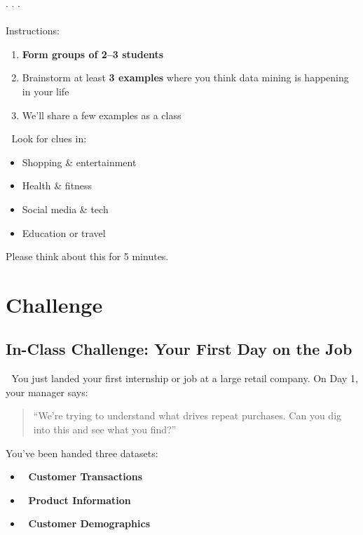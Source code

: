 \documentclass[
  letterpaper,
  DIV=11,
  numbers=noendperiod]{scrartcl}
\makeatletter
\let\oldparagraph\paragraph
\renewcommand{\paragraph}{
    \@ifstar
      \xxxParagraphStar
      \xxxParagraphNoStar
  }
\newcommand{\xxxParagraphStar}[1]{\oldparagraph*{#1}\mbox{}}
\newcommand{\xxxParagraphNoStar}[1]{\oldparagraph{#1}\mbox{}}
\providecommand{\tightlist}{%
  \setlength{\itemsep}{0pt}\setlength{\parskip}{0pt}}
\makeatother
\begin{document}
. . .

\paragraph{Instructions:}\label{instructions}

\begin{enumerate}
\def\labelenumi{\arabic{enumi}.}
\tightlist
\item
  \textbf{Form groups of 2--3 students}
\item
  Brainstorm at least \textbf{3 examples} where you think data mining is
  happening in your life
\item
  We'll share a few examples as a class
\end{enumerate}

💬 Look for clues in:

\begin{itemize}
\tightlist
\item
  Shopping \& entertainment
\item
  Health \& fitness
\item
  Social media \& tech
\item
  Education or travel
\end{itemize}

Please think about this for 5 minutes.

\label{5minWaiting}

\section{Challenge}\label{challenge}

\subsection{In-Class Challenge: Your First Day on the
Job}\label{in-class-challenge-your-first-day-on-the-job}

🎉 You just landed your first internship or job at a large retail
company. On Day 1, your manager says:

\begin{quote}
``We're trying to understand what drives repeat purchases. Can you dig
into this and see what you find?''
\end{quote}

You've been handed three datasets:

\begin{itemize}
\tightlist
\item
  🧾 \textbf{Customer Transactions}
\item
  🛒 \textbf{Product Information}
\item
  👥 \textbf{Customer Demographics}
\end{itemize}
\end{document}
